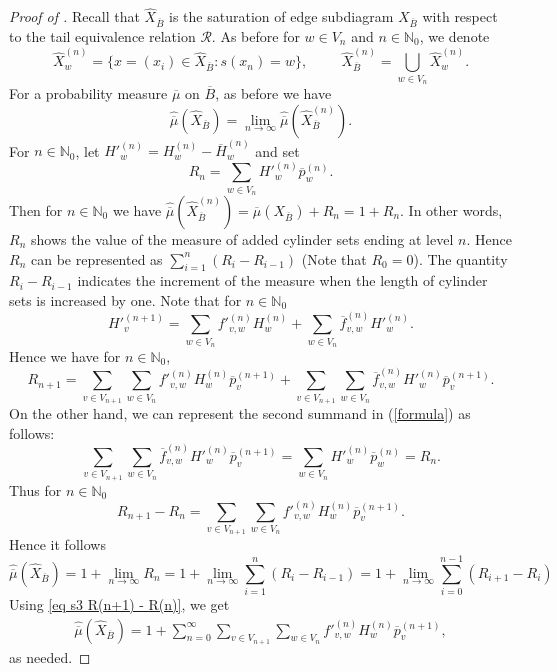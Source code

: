\documentclass[11pt,reqno]{amsart}
\theoremstyle{definition}
\theoremstyle{remark}
\theoremstyle{plain}
\def\ol{\overline}
\def\ov{\overline}
\def\wh{\widehat}
\newcommand{\N}{\mathbb N}
\newcommand{\be}{\begin{equation}}
\newcommand{\ee}{\end{equation}}
\numberwithin{equation}{section}
\begin{document}
\begin{proof}[Proof of ] Recall that $\widehat X_{\ol B} $ is the saturation of edge subdiagram $X_{\ol B}$ with respect to the tail equivalence relation $\mathcal R$. As before for $w \in V_n$ and $n \in \N_0$, we denote
\[
\widehat{X}_w^{(n)} = \{x = (x_i)\in \widehat{X}_{\ol B} : s(x_{n}) = w\}, \hspace{1cm} \wh X_{\ol B}^{(n)} = \bigcup_{w \in V_n} \widehat{X}_w^{(n)}.
\]
For a probability measure $\overline{\mu}$ on $\overline{B}$, as before we have
\[
\widehat{\overline{\mu}}
 (\wh X _{\ov B}) = \lim_{n \rightarrow \infty}
\widehat{\overline{\mu}} (\wh X_{\ov B}^{(n)}).
\]
For $n \in \N_0$, let ${H'}_w^{(n)} = H_w^{(n)} - \ov H_w^{(n)}$ and set
$$
R_{n} = \sum_{w \in V_{n}} {H'}_w^{(n)} \ov p_w^{(n)}.
$$
Then for $n \in \N_0$ we have $\widehat{\overline{\mu}} (\wh X_{\ov B}^{(n)}) = \ov \mu (X_{\ov B}) + R_n = 1 + R_n$.
In other words, $R_n$ shows the value of the measure of added cylinder sets ending at level $n$. Hence $R_n$ can be represented as $\sum_{i= 1}^n (R_i - R_{i-1})$ (Note that $R_0 = 0$). The quantity $R_i - R_{i-1}$ indicates the increment of the measure when 
the length of cylinder sets is increased by one. Note that for $n \in \N_0$
$$
{H'}_v^{(n+1)} = \sum_{w \in V_n}  {f'}_{v,w}^{(n)} H_w^{(n)} +  \sum_{w \in V_n} \ov f_{v,w}^{(n)} {H'}_w^{(n)}.
$$ 
Hence we have for $n \in \N_0$,
\begin{equation}\label{formula}
R_{n+1} = \sum_{v \in V_{n+1}} \sum_{w \in V_n} {f'}_{v,w}^{(n)} H_w^{(n)} \ov p_v^{(n+1)} + \sum_{v \in V_{n+1}} \sum_{w \in V_n} \ov f_{v,w}^{(n)} {H'}_w^{(n)} \ov p_v^{(n+1)}.
\end{equation}
On the other hand, we can represent the second summand in (\ref{formula}) as follows:
$$
\sum_{v \in V_{n+1}} \sum_{w \in V_n} \ov f_{v,w}^{(n)} {H'}_w^{(n)} \ov p_v^{(n+1)} = \sum_{w \in V_n}  {H'}_w^{(n)} \ov p_w^{(n)} = R_n.
$$
Thus for $n \in \N_0$
\be\label{eq s3 R(n+1) - R(n)}
R_{n+1} - R_n = \sum_{v \in V_{n+1}} \sum_{w \in V_n} {f'}_{v,w}^{(n)} H_w^{(n)} \ov p_v^{(n+1)}.
\ee
Hence it follows
$$
\wh{\ol\mu} (\wh X_{\ol B}) = 1 + \lim_{n\to\infty} R_n =
1+ \lim_{n\to\infty} \sum_{i= 1}^n (R_i - R_{i-1}) =
1+ \lim_{n\to\infty} \sum_{i= 0}^{n-1} (R_{i+1} - R_{i})
$$
Using \eqref{eq s3 R(n+1) - R(n)}, we get 
\begin{eqnarray*}
\widehat{\overline{\mu}}(\widehat{X}_{\overline{B}})
  =  1 + \sum_{n=0}^\infty \sum_{v\in V_{n+1}} \sum_{w\in V_{n}} {f'}_{v,w}^{(n)} H_w^{(n)} \overline{p}_v^{(n+1)},
\end{eqnarray*} as needed.
\end{proof} 
\end{document}
